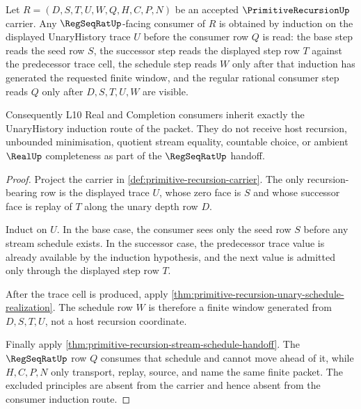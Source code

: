 \begin{theorem}
\label{thm:primitive-recursion-regseqrat-consumer-induction}
Let $R=(D,S,T,U,W,Q,H,C,P,N)$ be an accepted $\PrimitiveRecursionUp$ carrier. Any $\RegSeqRatUp$-facing consumer of $R$ is obtained by induction on the displayed UnaryHistory trace $U$ before the consumer row $Q$ is read: the base step reads the seed row $S$, the successor step reads the displayed step row $T$ against the predecessor trace cell, the schedule step reads $W$ only after that induction has generated the requested finite window, and the regular rational consumer step reads $Q$ only after $D,S,T,U,W$ are visible.

Consequently L10 Real and Completion consumers inherit exactly the UnaryHistory induction route of the packet. They do not receive host recursion, unbounded minimisation, quotient stream equality, countable choice, or ambient $\RealUp$ completeness as part of the $\RegSeqRatUp$ handoff.
\end{theorem}
\begin{proof}
Project the carrier in \autoref{def:primitive-recursion-carrier}. The only recursion-bearing row is the displayed trace $U$, whose zero face is $S$ and whose successor face is replay of $T$ along the unary depth row $D$.

Induct on $U$. In the base case, the consumer sees only the seed row $S$ before any stream schedule exists. In the successor case, the predecessor trace value is already available by the induction hypothesis, and the next value is admitted only through the displayed step row $T$.

After the trace cell is produced, apply \autoref{thm:primitive-recursion-unary-schedule-realization}. The schedule row $W$ is therefore a finite window generated from $D,S,T,U$, not a host recursion coordinate.

Finally apply \autoref{thm:primitive-recursion-stream-schedule-handoff}. The $\RegSeqRatUp$ row $Q$ consumes that schedule and cannot move ahead of it, while $H,C,P,N$ only transport, replay, source, and name the same finite packet. The excluded principles are absent from the carrier and hence absent from the consumer induction route.
\end{proof}

